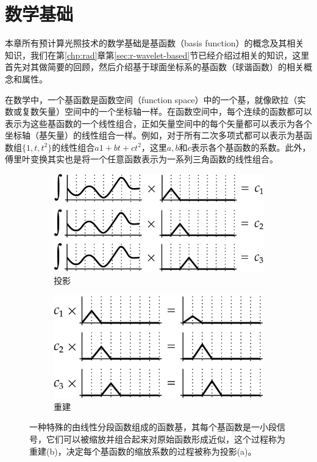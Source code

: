 \section{数学基础}\label{sec:pl-sh}
本章所有预计算光照技术的数学基础是基函数（basis function）的概念及其相关知识，我们在第\ref{chp:rad}章第\ref{sec:r-wavelet-based}节已经介绍过相关的知识，这里首先对其做简要的回顾，然后介绍基于球面坐标系的基函数（球谐函数）的相关概念和属性。

在数学中，一个基函数是函数空间（function space）中的一个基，就像欧拉（实数或复数矢量）空间中的一个坐标轴一样。在函数空间中，每个连续的函数都可以表示为这些基函数的一个线性组合，正如矢量空间中的每个矢量都可以表示为各个坐标轴（基矢量）的线性组合一样。例如，对于所有二次多项式都可以表示为基函数组$\{1,t,t^{2}\}$的线性组合$a1+bt+ct^{2}$，这里$a,b$和$c$表示各个基函数的系数。此外，傅里叶变换其实也是将一个任意函数表示为一系列三角函数的线性组合。

\begin{figure}
	\begin{subfigure}[b]{0.49\textwidth}
		\includegraphics[width=\textwidth]{figures/prt/prt-1}
		\caption{投影}
	\end{subfigure}
		\begin{subfigure}[b]{0.49\textwidth}
		\includegraphics[width=\textwidth]{figures/prt/prt-2}
			\caption{重建}
	\end{subfigure}
	\caption{一种特殊的由线性分段函数组成的函数基，其每个基函数是一小段信号，它们可以被缩放并组合起来对原始函数形成近似，这个过程称为重建(b)，决定每个基函数的缩放系数的过程被称为投影(a)。}
	\label{f:pl-projection-and-reconstruction}
\end{figure}


